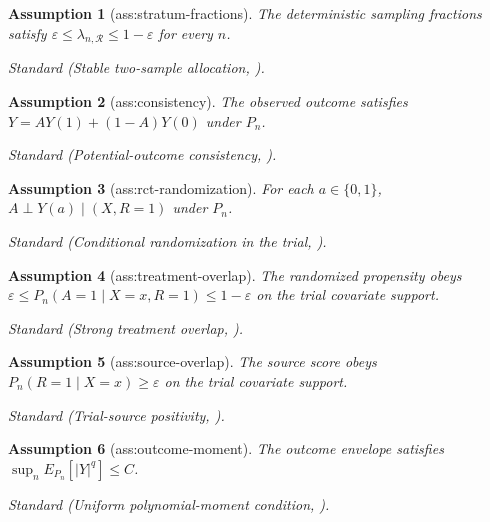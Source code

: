 \documentclass{article}
\newtheorem{assumption}{Assumption}
\begin{document}
\begin{assumption}[ass:stratum-fractions]\label{ass:stratum-fractions}
The deterministic sampling fractions satisfy \(\varepsilon\le\lambda_{n,\mathcal R}\le1-\varepsilon\) for every \(n\).
\par\smallskip\noindent\emph{Standard} (Stable two-sample allocation, \cite{ValanciusEtAl2024}).
\end{assumption}

\begin{assumption}[ass:consistency]\label{ass:consistency}
The observed outcome satisfies \(Y=AY(1)+(1-A)Y(0)\) under \(P_n\).
\par\smallskip\noindent\emph{Standard} (Potential-outcome consistency, \cite{YangLiWuYang2026}).
\end{assumption}

\begin{assumption}[ass:rct-randomization]\label{ass:rct-randomization}
For each \(a\in\{0,1\}\), \(A\perp Y(a)\mid(X,R=1)\) under \(P_n\).
\par\smallskip\noindent\emph{Standard} (Conditional randomization in the trial, \cite{YangLiWuYang2026}).
\end{assumption}

\begin{assumption}[ass:treatment-overlap]\label{ass:treatment-overlap}
The randomized propensity obeys \(\varepsilon\le P_n(A=1\mid X=x,R=1)\le1-\varepsilon\) on the trial covariate support.
\par\smallskip\noindent\emph{Standard} (Strong treatment overlap, \cite{YangLiWuYang2026}).
\end{assumption}

\begin{assumption}[ass:source-overlap]\label{ass:source-overlap}
The source score obeys \(P_n(R=1\mid X=x)\ge\varepsilon\) on the trial covariate support.
\par\smallskip\noindent\emph{Standard} (Trial-source positivity, \cite{ValanciusEtAl2024}).
\end{assumption}

\begin{assumption}[ass:outcome-moment]\label{ass:outcome-moment}
The outcome envelope satisfies \(\sup_n E_{P_n}[|Y|^q]\le C\).
\par\smallskip\noindent\emph{Standard} (Uniform polynomial-moment condition, \cite{ChernozhukovChetverikovKatoKoike2022}).
\end{assumption}
\end{document}
